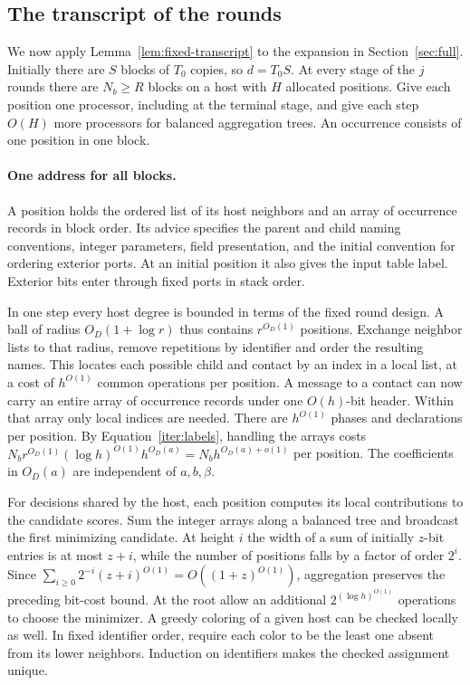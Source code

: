 \subsection{The transcript of the rounds}

We now apply Lemma~\ref{lem:fixed-transcript} to the expansion in
Section~\ref{sec:full}. Initially there are $S$ blocks of $T_0$
copies, so $d=T_0S$. At every stage of the $j$ rounds there are
$N_b\ge R$ blocks on a host with $H$ allocated positions. Give each
position one processor, including at the terminal stage, and give
each step $O(H)$ more processors for balanced aggregation trees. An
occurrence consists of one position in one block.

\paragraph{One address for all blocks.}
A position holds the ordered list of its host neighbors and an array
of occurrence records in block order. Its advice specifies the
parent and child naming conventions, integer parameters, field
presentation, and the initial convention for ordering exterior ports. At an
initial position it also gives the input table label. Exterior bits
enter through fixed ports in stack order.

In one step every host degree is bounded in terms of the fixed round
design. A ball of radius $O_D(1+\log r)$ thus contains $r^{O_D(1)}$
positions. Exchange neighbor lists to that radius, remove repetitions
by identifier and order the resulting names. This locates each
possible child and contact by an index in a local list, at a cost of
$h^{O(1)}$ common operations per position. A message to a contact
can now carry an entire array of occurrence records under one
$O(h)$-bit header. Within that array only local indices are needed.
There are $h^{O(1)}$ phases and declarations per position. By
Equation~\eqref{iter:labels}, handling the arrays costs
$N_b r^{O_D(1)}(\log h)^{O(1)}h^{O_D(a)}
=N_b h^{O_D(a)+o(1)}$ per position. The coefficients in $O_D(a)$
are independent of $a,b,\beta$.

For decisions shared by the host, each position computes its local
contributions to the candidate scores. Sum the integer arrays along
a balanced tree and broadcast the first minimizing candidate. At
height $i$ the width of a sum of initially $z$-bit entries is at
most $z+i$, while the number of positions falls by a factor of order
$2^i$. Since
$\sum_{i\ge0}2^{-i}(z+i)^{O(1)}=O((1+z)^{O(1)})$, aggregation
preserves the preceding bit-cost bound. At the root allow an
additional $2^{(\log h)^{O(1)}}$ operations to choose the
minimizer. A greedy coloring of a given host can be checked locally
as well. In fixed identifier order, require each color to be the
least one absent from its lower neighbors. Induction on identifiers
makes the checked assignment unique.


